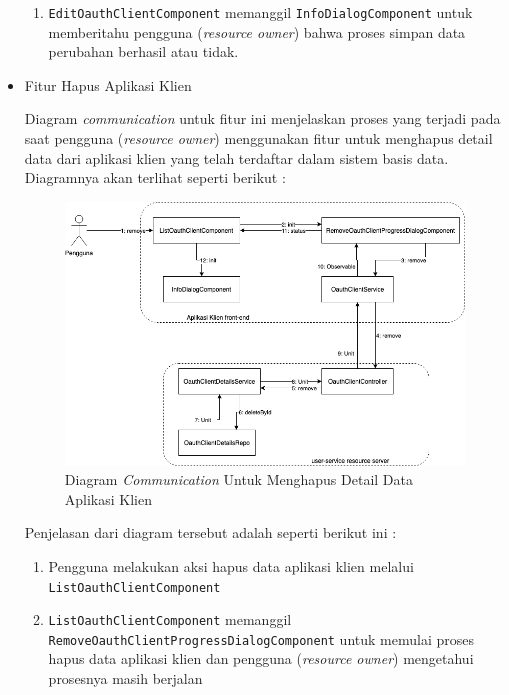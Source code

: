 \documentclass[pdftex,12pt, oneside]{article}
\begin{document}
\begin{itemize}
\begin{enumerate}
		\item \texttt{EditOauthClientComponent} memanggil \texttt{InfoDialogComponent} untuk memberitahu pengguna (\textit{resource owner}) bahwa proses simpan data perubahan berhasil atau tidak.
	\end{enumerate}
	
	\item Fitur Hapus Aplikasi Klien
	
	Diagram \textit{communication} untuk fitur ini menjelaskan proses yang terjadi pada saat pengguna (\textit{resource owner}) menggunakan fitur untuk menghapus detail data dari aplikasi klien yang telah terdaftar dalam sistem basis data. Diagramnya akan terlihat seperti berikut :
	
	\begin{figure}[H]
		\centering
		\includegraphics[width=1\textwidth]{./resources/comm-dia-remove-client}
		\caption{Diagram \textit{Communication} Untuk Menghapus Detail Data Aplikasi Klien}
		\label{fig:comm-dia-remove-client}
	\end{figure}
	
	Penjelasan dari diagram tersebut adalah seperti berikut ini :
	
	\begin{enumerate}
		\item Pengguna melakukan aksi hapus data aplikasi klien melalui \texttt{ListOauthClientComponent}
		
		\item \texttt{ListOauthClientComponent} memanggil \texttt{RemoveOauthClientProgressDialogComponent} untuk memulai proses hapus data aplikasi klien dan pengguna (\textit{resource owner}) mengetahui prosesnya masih berjalan
		

\end{enumerate}
\end{itemize}
\end{document}
